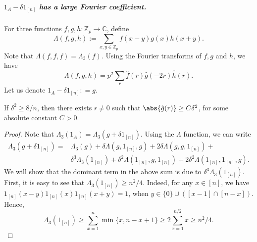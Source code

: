 \documentclass{article}
\begin{document}
\subparagraph*{$1_A - \delta1_{[n]}$ has a large Fourier coefficient.}
For three functions $f,g,h : \mathbb{Z}_p \to \mathbb{C}$, define 
$$\Lambda(f,g,h) := \sum_{x,y\in \mathbb{Z}_p}f(x-y)g(x)h(x+y).$$
Note that $\Lambda(f,f,f) = \Lambda_3(f)$. Using the Fourier transforms of $f,g$ and $h$, we have
\begin{equation}\label{eq:fourier-sum}
\Lambda(f,g,h) = p^2\sum_r\hat{f}(r)\hat{g}(-2r)\hat{h}(r).
\end{equation}
Let us denote $1_A - \delta1_{[n]} : = g$. 

\begin{claim}
If $\delta^2 \geq 8/n$, then there exists $r\neq 0$ such that $\abs{\hat{g}(r)} \geq C\delta^2$, for some absolute constant $C > 0$.
\end{claim}
\begin{proof} 
Note that $\Lambda_3(1_A) = \Lambda_3(g+\delta1_{[n]})$. Using the $\Lambda$ function, we can write 
\begin{align*}
    \Lambda_3(g+\delta1_{[n]}) =& \Lambda_3(g) + \delta\Lambda(g,1_{[n]},g) + 2\delta\Lambda(g,g,1_{[n]}) +\\
&\delta^3\Lambda_3(1_{[n]}) + \delta^2\Lambda(1_{[n]},g,1_{[n]}) + 2\delta^2\Lambda(1_{[n]},1_{[n]},g).
\end{align*}
We will show that the dominant term in the above sum is due to $\delta^3\Lambda_3(1_{[n]})$. 
First, it is easy to see that $\Lambda_3(1_{[n]})\geq n^2/4$. Indeed, for any $x\in [n]$, we have $1_{[n]}(x-y)1_{[n]}(x)1_{[n]}(x+y) = 1$, when $y\in \{0\}\cup([x-1]\cap[n-x])$. Hence, $$\Lambda_3(1_{[n]}) \geq \sum_{x = 1}^{n}\min\{x,n-x+1\} \geq 2\sum_{x=1}^{n/2}x \geq n^2/4.$$ 


\end{proof}
\end{document}

